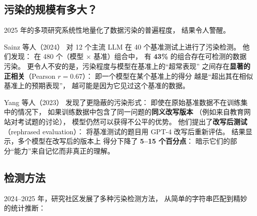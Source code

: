 \subsection{污染的规模有多大？}

2025 年的多项研究系统性地量化了数据污染的普遍程度，
结果令人警醒。

Sainz 等人（2024）%
对 12 个主流 LLM 在 40 个基准测试上进行了污染检测。
他们发现：
在 480 个（模型 $\times$ 基准）组合中，
有 \textbf{43\%} 的组合存在可检测的数据污染。
更令人不安的是，污染程度与模型在基准上的“超常表现”
之间存在\textbf{显著的正相关}（Pearson $r = 0.67$）：
即一个模型在某个基准上的得分
越是“超出其在相似基准上的预期表现”，
越可能是因为它见过这个基准的数据。

Yang 等人（2023）%
发现了更隐蔽的污染形式：
即使在原始基准数据不在训练集中的情况下，
如果训练数据中包含了同一问题的\textbf{同义改写版本}
（例如来自教育网站对考试题的讨论），
模型仍然可以获得不公平的优势。
他们提出了\textbf{改写后测试}（rephrased evaluation）：
将基准测试的题目用 GPT-4 改写后重新评估。
结果显示，多个模型在改写后的版本上
得分下降了 \textbf{5--15 个百分点}：
暗示它们的部分“能力”来自记忆而非真正的理解。

\subsection{检测方法}

2024--2025 年，研究社区发展了多种污染检测方法，
从简单的字符串匹配到精妙的统计推断：

